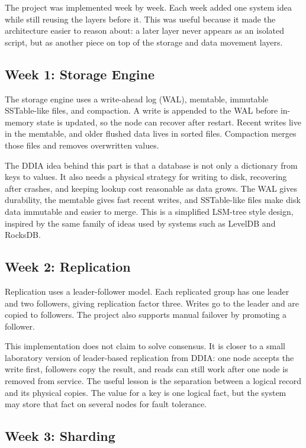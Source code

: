 The project was implemented week by week. Each week added one system idea while
still reusing the layers before it. This was useful because it made the
architecture easier to reason about: a later layer never appears as an isolated
script, but as another piece on top of the storage and data movement layers.

\subsection{Week 1: Storage Engine}

The storage engine uses a write-ahead log (WAL), memtable, immutable SSTable-like
files, and compaction. A write is appended to the WAL before in-memory state is
updated, so the node can recover after restart. Recent writes live in the
memtable, and older flushed data lives in sorted files. Compaction merges those
files and removes overwritten values.

The DDIA idea behind this part is that a database is not only a dictionary from
keys to values. It also needs a physical strategy for writing to disk, recovering
after crashes, and keeping lookup cost reasonable as data grows. The WAL gives
durability, the memtable gives fast recent writes, and SSTable-like files make
disk data immutable and easier to merge. This is a simplified LSM-tree style
design, inspired by the same family of ideas used by systems such as LevelDB and
RocksDB.

\subsection{Week 2: Replication}

Replication uses a leader-follower model. Each replicated group has one leader
and two followers, giving replication factor three. Writes go to the leader and
are copied to followers. The project also supports manual failover by promoting
a follower.

This implementation does not claim to solve consensus. It is closer to a small
laboratory version of leader-based replication from DDIA: one node accepts the
write first, followers copy the result, and reads can still work after one node
is removed from service. The useful lesson is the separation between a logical
record and its physical copies. The value for a key is one logical fact, but the
system may store that fact on several nodes for fault tolerance.

\subsection{Week 3: Sharding}

